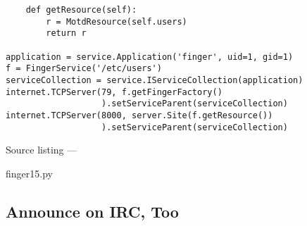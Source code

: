 \begin{verbatim}
    def getResource(self):
        r = MotdResource(self.users)
        return r

application = service.Application('finger', uid=1, gid=1)
f = FingerService('/etc/users')
serviceCollection = service.IServiceCollection(application)
internet.TCPServer(79, f.getFingerFactory()
                   ).setServiceParent(serviceCollection)
internet.TCPServer(8000, server.Site(f.getResource())
                   ).setServiceParent(serviceCollection)
\end{verbatim}\parbox[b]{\linewidth}{\begin{center}Source listing --- \begin{em}finger15.py\end{em}\end{center}}

\subsection{Announce on IRC, Too}


